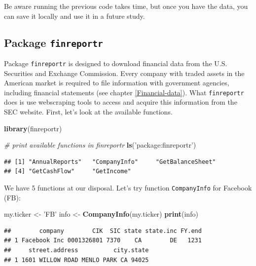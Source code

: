 \documentclass[11pt,]{book}
\newenvironment{Shaded}{\begin{snugshade}}{\end{snugshade}}
\newcommand{\KeywordTok}[1]{\textcolor[rgb]{0.27,0.27,0.27}{\textbf{#1}}}
\newcommand{\StringTok}[1]{\textcolor[rgb]{0.5,0.5,0.5}{#1}}
\newcommand{\CommentTok}[1]{\textcolor[rgb]{0.56,0.35,0.01}{\textit{#1}}}
\newcommand{\NormalTok}[1]{#1}
\begin{document}
Be aware running the previous code takes time, but once you have the
data, you can save it locally and use it in a future study.

\subsection{\texorpdfstring{Package
\texttt{finreportr}}{Package finreportr}}\label{package-finreportr}

Package \texttt{finreportr} \citep{finreportr} is designed to download
financial data from the U.S. Securities and Exchange Commission. Every
company with traded assets in the American market is required to file
information with government agencies, including financial statements
(see chapter \ref{Financial-data}). What \texttt{finreportr} does is use
webscraping tools to access and acquire this information from the SEC
website. First, let's look at the available functions.

\begin{Shaded}
\begin{Highlighting}[]
\KeywordTok{library}\NormalTok{(finreportr)}

\CommentTok{# print available functions in finreportr}
\KeywordTok{ls}\NormalTok{(}\StringTok{'package:finreportr'}\NormalTok{)}
\end{Highlighting}
\end{Shaded}

\begin{verbatim}
## [1] "AnnualReports"   "CompanyInfo"     "GetBalanceSheet"
## [4] "GetCashFlow"     "GetIncome"
\end{verbatim}

We have 5 functions at our disposal. Let's try function
\texttt{CompanyInfo} for Facebook (FB):

\begin{Shaded}
\begin{Highlighting}[]
\NormalTok{my.ticker <-}\StringTok{ 'FB'}
\NormalTok{info <-}\StringTok{ }\KeywordTok{CompanyInfo}\NormalTok{(my.ticker)}
\KeywordTok{print}\NormalTok{(info)}
\end{Highlighting}
\end{Shaded}

\begin{verbatim}
##        company        CIK  SIC state state.inc FY.end
## 1 Facebook Inc 0001326801 7370    CA        DE   1231
##     street.address          city.state
## 1 1601 WILLOW ROAD MENLO PARK CA 94025
\end{verbatim}
\end{document}
